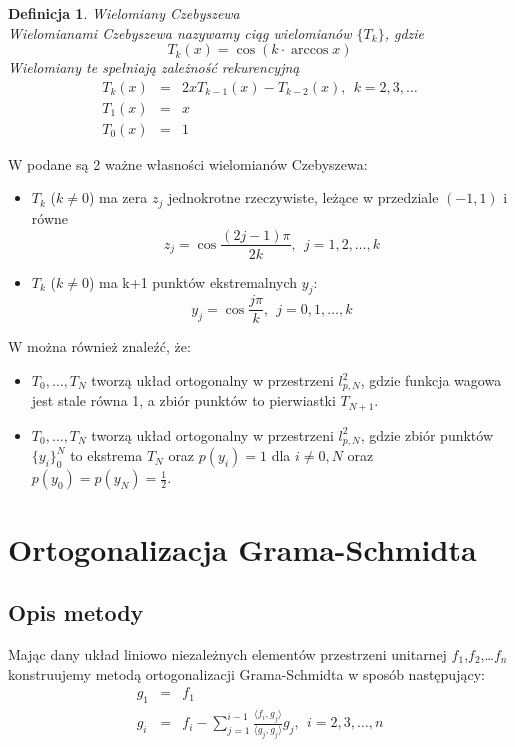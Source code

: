 \documentclass[12pt,wide]{mwart}
\newtheorem{defin}{Definicja}
\begin{document}
\begin{defin}{Wielomiany Czebyszewa}\\
Wielomianami Czebyszewa nazywamy ciąg wielomianów $\{T_k\}$, gdzie 
$$
	T_k(x) = \cos(k \cdot \arccos x)
$$
Wielomiany te spełniają zależność rekurencyjną
\begin{eqnarray*}
T_k(x) &=& 2xT_{k-1}(x) - T_{k-2}(x), \ \ k = 2,3,\ldots \\
T_1(x) &=& x\\
T_0(x) &=& 1
\end{eqnarray*}
\end{defin}
W \cite[strony 98-99]{JMJ} podane są 2 ważne własności wielomianów Czebyszewa:
\begin{itemize}
\item $T_k$ ($k \neq 0$) ma zera $z_j$ jednokrotne rzeczywiste, leżące w przedziale $(-1,1)$ i równe
$$
	z_j = \cos\frac{(2j-1)\pi}{2k}, \ \  j = 1,2,\ldots,k
$$
\item $T_k$ ($k \neq 0$) ma k+1 punktów ekstremalnych $y_j$:
$$
y_j = \cos \frac{j\pi}{k}, \ \ j = 0,1,\ldots,k
$$
\end{itemize}
W \cite{Czeb} można również znaleźć, że:
\begin{itemize}
\item $T_0,\ldots,T_N$ tworzą układ ortogonalny w przestrzeni $l^2_{p,N}$, gdzie funkcja wagowa jest stale równa 1, a zbiór punktów to pierwiastki $T_{N+1}$.
\item $T_0,\ldots,T_N$ tworzą układ ortogonalny w przestrzeni $l^2_{p,N}$, gdzie zbiór punktów $\{y_i\}_0^N$ to ekstrema $T_{N}$ oraz $p(y_i) = 1$ dla $i \neq 0,N$ oraz $p(y_0) = p(y_N) = \frac{1}{2}$.
\end{itemize}


\section{Ortogonalizacja Grama-Schmidta}
\subsection{Opis metody}
Mając dany układ liniowo niezależnych elementów przestrzeni unitarnej $f_1$,$f_2$,\ldots$f_n$ konstruujemy metodą ortogonalizacji Grama-Schmidta w sposób następujący:
\begin{eqnarray*}
	g_1 &=& f_1 \\
	g_i &=& f_i - \sum^{i-1}_{j=1} \frac{\langle f_i,g_j\rangle}{\langle g_j,g_j\rangle}g_j,  \ \  i = 2,3,\ldots,n
\end{eqnarray*}
\end{document}
